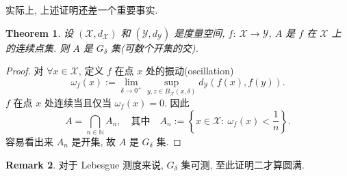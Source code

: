 \documentclass[a4paper,11pt]{article}
\newtheorem{theorem}{Theorem}[section]
\theoremstyle{definition}
\newtheorem{remark}[theorem]{Remark}
\begin{document}
实际上, 上述证明还差一个重要事实.

\begin{theorem} \label{1}
    设 $ (\mathcal{X}, d_\mathcal{X}) $ 和 $ (\mathcal{Y}, d_\mathcal{Y}) $ 是度量空间,
    $ f :\ \mathcal{X} \to \mathcal{Y} $, $ A $ 是 $ f $ 在 $ \mathcal{X} $ 上的连续点集.
    则 $ A $ 是 $ G_\delta $ 集(可数个开集的交).
\end{theorem}

\begin{proof}
    对 $ \forall x \in \mathcal{X} $, 定义 $ f $ 在点 $ x $ 处的振动(oscillation)
    $$
        \omega_f(x) := \lim_{\delta \to 0^+} \sup_{y, z \in B_\mathcal{X}(x, \delta)} 
            d_\mathcal{Y} \left( f(x), f(y) \right) .
    $$
    $ f $ 在点 $ x $ 处连续当且仅当 $ \omega_f(x) = 0 $. 因此
    $$
        A = \bigcap_{n \in \mathbb{N}} A_n, 
        \quad\text{其中}\quad A_n := \left\{ x \in \mathcal{X} :\ \omega_f(x) < \frac{1}{n} \right\}.
    $$
    容易看出来 $ A_n $ 是开集, 故 $ A $ 是 $ G_\delta $ 集.
\end{proof}

\begin{remark}
    对于 Lebesgue 测度来说, $ G_\delta $ 集可测, 至此证明二才算圆满.
\end{remark}
\end{document}
